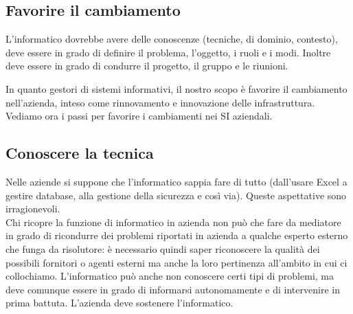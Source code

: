     
\subsection{Favorire il cambiamento}

L'informatico dovrebbe avere delle conoscenze (tecniche, di dominio, contesto), 
deve essere in grado di definire il problema, l'oggetto, i ruoli e i modi. 
Inoltre deve essere in grado di condurre il progetto, il gruppo e le riunioni.

In quanto gestori di sistemi informativi, il nostro scopo \`e favorire il 
cambiamento nell'azienda, inteso come rinnovamento e innovazione delle 
infrastruttura. Vediamo ora i passi per favorire i cambiamenti nei SI aziendali.

\subsection{Conoscere la tecnica}  
Nelle aziende si suppone che l'informatico sappia fare di tutto 
(dall'usare Excel a gestire database, alla gestione della 
sicurezza e cos\`i via). Queste aspettative sono irragionevoli. \\
Chi ricopre la funzione di informatico in azienda non pu\`o che fare da 
mediatore in grado di ricondurre dei problemi riportati in azienda a qualche 
esperto esterno che funga da risolutore: \`e necessario quindi saper riconoscere 
la qualit\`a dei possibili fornitori o agenti esterni ma anche la loro 
pertinenza all'ambito in cui ci collochiamo.
L'informatico pu\`o anche non conoscere certi tipi di problemi, ma deve comunque 
essere in grado di informarsi autonomamente e di intervenire in prima battuta. 
L'azienda deve sostenere l'informatico.

